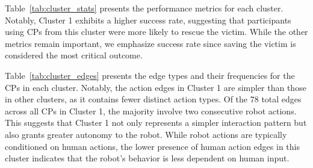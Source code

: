 \documentclass[letterpaper, 10 pt, conference]{ieeeconf}  %
\begin{document}
Table~\ref{tab:cluster_stats} presents the performance metrics for each cluster.
Notably, Cluster 1 exhibits a higher success rate, suggesting that participants using
CPs from this cluster were more likely to rescue the victim. While the other metrics
remain important, we emphasize success rate since saving the victim is considered the
most critical outcome.

\begin{table}[tb]
    \centering
    \renewcommand{\arraystretch}{1.2}
    \caption{Cluster statistics (higher is better for success rate and lower is better for the others.), with differences from the mean in parentheses.}
    \label{tab:cluster_stats}
\end{table}

Table~\ref{tab:cluster_edges} presents the edge types and their frequencies for the CPs
in each cluster. Notably, the action edges in Cluster 1 are simpler than those in other
clusters, as it contains fewer distinct action types. Of the 78 total edges across all
CPs in Cluster 1, the majority involve two consecutive robot actions. This suggests that
Cluster 1 not only represents a simpler interaction pattern but also grants greater
autonomy to the robot. While robot actions are typically conditioned on human actions,
the lower presence of human action edges in this cluster indicates that the robot's
behavior is less dependent on human input.
\end{document}
